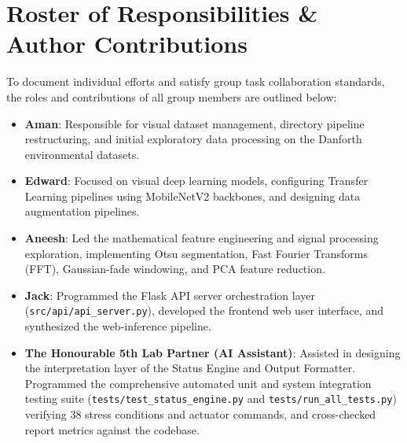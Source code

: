 \documentclass[11pt,a4paper]{article}
\begin{document}
\section{Roster of Responsibilities \& Author Contributions}\label{sec:appendix_roster}
To document individual efforts and satisfy group task collaboration standards, the roles and contributions of all group members are outlined below:
\begin{itemize}
    \item \textbf{Aman}: Responsible for visual dataset management, directory pipeline restructuring, and initial exploratory data processing on the Danforth environmental datasets.
    \item \textbf{Edward}: Focused on visual deep learning models, configuring Transfer Learning pipelines using MobileNetV2 backbones, and designing data augmentation pipelines.
    \item \textbf{Aneesh}: Led the mathematical feature engineering and signal processing exploration, implementing Otsu segmentation, Fast Fourier Transforms (FFT), Gaussian-fade windowing, and PCA feature reduction.
    \item \textbf{Jack}: Programmed the Flask API server orchestration layer (\texttt{src/api/api_server.py}), developed the frontend web user interface, and synthesized the web-inference pipeline.
    \item \textbf{The Honourable 5th Lab Partner (AI Assistant)}: Assisted in designing the interpretation layer of the Status Engine and Output Formatter. Programmed the comprehensive automated unit and system integration testing suite (\texttt{tests/test_status_engine.py} and \texttt{tests/run_all_tests.py}) verifying 38 stress conditions and actuator commands, and cross-checked report metrics against the codebase.
\end{itemize}
\end{document}
